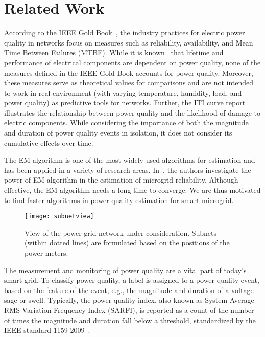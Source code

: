 \section{Related Work}
According to the IEEE Gold Book~\cite{goldbook}, the industry practices for electric power quality in networks focus on measures such as reliability, availability, and Mean Time Between Failures (MTBF). While it is known~\cite{iti_curve} that lifetime and performance of electrical components are dependent on power quality, none of the measures defined in the IEEE Gold Book accounts for power quality. Moreover, these measures serve as theoretical values for comparisons and are not intended to work in real environment (with varying temperature, humidity, load, and power quality) as predictive tools for networks. Further, the ITI curve report illustrates the relationship between power quality and the likelihood of damage to electric components. While considering the importance of both the magnitude and duration of power quality events in isolation, it does not consider its cumulative effects over time.

The EM algorithm is one of the most widely-used algorithms for estimation and has been applied in a variety of research areas.
 In~\cite{catherine_pri}, the authors investigate the power of EM algorithm in the estimation of microgrid reliability. Although effective, the EM algorithm needs a long time to converge. We are thus motivated to find faster algorithms in power quality estimation for smart microgrid.

\begin{landscape}
\begin{figure}[!p]
    \centering
    \texttt{[image: subnetview]}
    \vspace{0.5cm}    
    \caption{View of the power grid network under consideration. Subnets (within dotted lines) are formulated based on the positions of the power meters.}
    \vspace{1.5cm}
    \label{fig:subnetview}
\end{figure}
\end{landscape}

The measurement and monitoring of power quality are a vital part of today's smart grid. To classify power quality, a label is assigned to a power quality event, based on the feature of the event, e.g., the magnitude and duration of a voltage sage or swell. Typically, the power quality index, also known as System Average RMS Variation Frequency Index (SARFI), is reported as a count of the number of times the magnitude and duration fall below a threshold, standardized by the IEEE standard 1159-2009~\cite{IEEE09_1159}.


